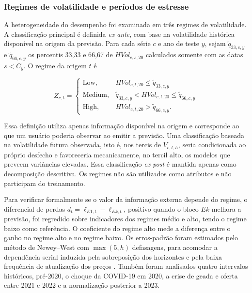 \documentclass[a4paper,fleqn]{cas-sc}
\begin{document}
\subsubsection{Regimes de volatilidade e períodos de estresse}
\label{subsec:regimes}

A heterogeneidade do desempenho foi examinada em três regimes de volatilidade. A classificação principal é definida \textit{ex ante}, com base na volatilidade histórica disponível na origem da previsão. Para cada série \(c\) e ano de teste \(y\), sejam \(\tilde q_{33,c,y}\) e \(\tilde q_{66,c,y}\) os percentis 33,33 e 66,67 de \(HVol_{c,s,20}\) calculados somente com as datas \(s<C_y\). O regime da origem \(t\) é

\begin{equation}
Z_{c,t}
=
\begin{cases}
\mathrm{Low}, & HVol_{c,t,20}\leq \tilde q_{33,c,y} \\
\mathrm{Medium}, & \tilde q_{33,c,y}<HVol_{c,t,20}\leq \tilde q_{66,c,y} \\
\mathrm{High}, & HVol_{c,t,20}>\tilde q_{66,c,y}.
\end{cases}
\label{eq:regimes}
\end{equation}

Essa definição utiliza apenas informação disponível na origem e corresponde ao que um usuário poderia observar ao emitir a previsão. Uma classificação baseada na volatilidade futura observada, isto é, nos tercis de \(V_{c,t,h}\), seria condicionada ao próprio desfecho e favoreceria mecanicamente, no tercil alto, os modelos que preveem variâncias elevadas. Essa classificação \textit{ex post} é mantida apenas como decomposição descritiva. Os regimes não são utilizados como atributos e não participam do treinamento.

Para verificar formalmente se o valor da informação externa depende do regime, o diferencial de perdas \(d_t=\ell_{E1,t}-\ell_{Ek,t}\), positivo quando o bloco \(Ek\) melhora a previsão, foi regredido sobre indicadores dos regimes médio e alto, tendo o regime baixo como referência. O coeficiente do regime alto mede a diferença entre o ganho no regime alto e no regime baixo. Os erros-padrão foram estimados pelo método de Newey--West com \(\max(5,h)\) defasagens, para acomodar a dependência serial induzida pela sobreposição dos horizontes e pela baixa frequência de atualização dos preços \citep{NeweyWest1987}. Também foram analisados quatro intervalos históricos, pré-2020, o choque da COVID-19 em 2020, a crise de geada e oferta entre 2021 e 2022 e a normalização posterior a 2023.
\end{document}
